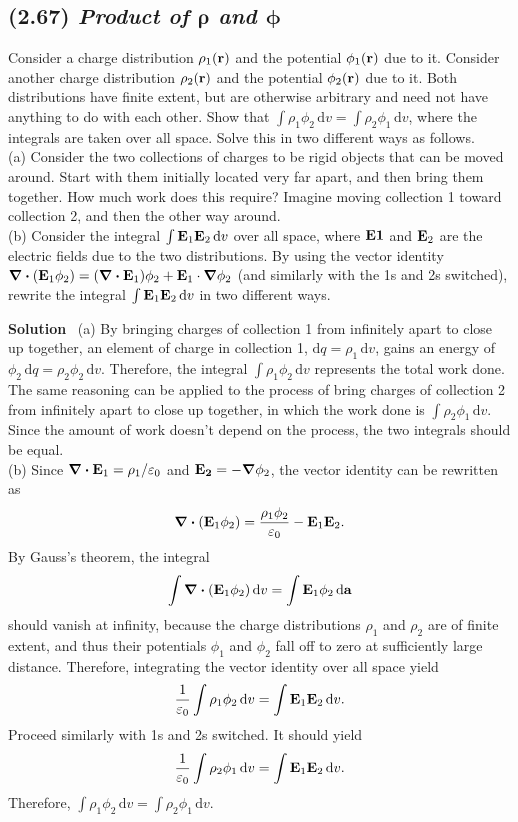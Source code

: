 \documentclass[hidelinks]{article}
\begin{document}
\subsection{(2.67) \textit{Product of $\boldsymbol{\rho}$ and $\boldsymbol{\phi}$}}
Consider a charge distribution $\rho_1(\vb{r})$ and the potential $\phi_1(\vb{r})$ due to it. Consider another charge distribution $\rho_2(\vb{r})$ and the potential $\phi_2(\vb{r})$ due to it. Both distributions have finite extent, but are otherwise arbitrary and need not have anything to do with each other. Show that $\int \rho_1 \phi_2 \, \mathrm{d}v = \int \rho_2 \phi_1 \, \mathrm{d}v$, where the integrals are taken over all space. Solve this in two different ways as follows.\\[3mm]
(a) Consider the two collections of charges to be rigid objects that
can be moved around. Start with them initially located very far
apart, and then bring them together. How much work does this
require? Imagine moving collection 1 toward collection 2, and
then the other way around. \\
(b) Consider the integral $\int \vb{E}_1 \vb{E}_2 \, \mathrm{d}v$ over all space, where $\vb{E1}$ and $\vb{E}_2$ are the electric fields due to the two distributions. By using the vector identity $\div (\vb{E}_1 \phi_2) = (\div \vb{E}_1) \phi_2 + \vb{E}_1 \cdot \grad \phi_2$ (and similarly with the 1s and 2s switched), rewrite the integral $\int \vb{E}_1 \vb{E}_2 \, \mathrm{d}v$ in two different ways.

\vspace{0.5cm}
\noindent
\textbf{Solution} \, (a) By bringing charges of collection 1 from infinitely apart to close up together, an element of charge in collection 1, $\mathrm{d}q = \rho_1 \, \mathrm{d}v$, gains an energy of $\phi_2 \, \mathrm{d}q = \rho_2 \phi_2 \, \mathrm{d}v$. Therefore, the integral $\int \rho_1 \phi_2 \, \mathrm{d}v$ represents the total work done. The same reasoning can be applied to the process of bring charges of collection 2 from infinitely apart to close up together, in which the work done is $\int \rho_2 \phi_1 \, \mathrm{d}v$. Since the amount of work doesn't depend on the process, the two integrals should be equal. \\[3mm]
(b) Since $\div \vb{E}_1 = \rho_1 / \varepsilon_0$ and $\vb{E_2} = -\grad \phi_2$, the vector identity can be rewritten as
$$\div{(\vb{E}_1 \phi_2)} = \frac{\rho_1 \phi_2}{\varepsilon_0} - \vb{E}_1  \vb{E}_2.$$
By Gauss's theorem, the integral
$$\int \div (\vb{E}_1 \phi_2) \, \mathrm{d}v = \int \vb{E}_1 \phi_2 \, \mathrm{d}\vb{a}$$
should vanish at infinity, because the charge distributions $\rho_1$ and $\rho_2$ are of finite extent, and thus their potentials $\phi_1$ and $\phi_2$ fall off to zero at sufficiently large distance. Therefore, integrating the vector identity over all space yield
$$ \frac{1}{\varepsilon_0} \int \rho_1 \phi_2 \, \mathrm{d}v = \int \vb{E}_1 \vb{E}_2 \, \mathrm{d}v.$$
Proceed similarly with 1s and 2s switched. It should yield
$$ \frac{1}{\varepsilon_0} \int \rho_2 \phi_1 \, \mathrm{d}v = \int \vb{E}_1 \vb{E}_2 \, \mathrm{d}v.$$
Therefore, $\int \rho_1 \phi_2 \, \mathrm{d}v = \int \rho_2 \phi_1 \, \mathrm{d}v$.
\end{document}
